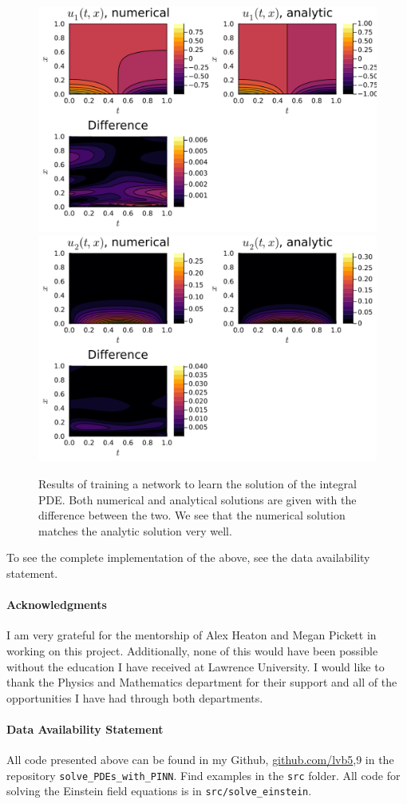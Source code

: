 \documentclass{CUP-JNL-DTM}%
\theoremstyle{definition}
\numberwithin{equation}{section}
\begin{document}
\begin{figure}
\centering
    \includegraphics[width=0.48\linewidth]{figures/integral_PDE_plots/plot_u1.png}
    \includegraphics[width=0.48\linewidth]{figures/integral_PDE_plots/plot_u2.png}
    \caption{Results of training a network to learn the solution of the integral PDE. Both numerical and analytical solutions are given with the difference between the two. We see that the numerical solution matches the analytic solution very well.}
    \label{fig:integro_results}
\end{figure}

To see the complete implementation of the above, see the data availability statement. 


\begin{Backmatter}

\paragraph{Acknowledgments}

I am very grateful for the mentorship of Alex Heaton and Megan Pickett in working on this project. Additionally, none of this would have been possible without the education I have received at Lawrence University. I would like to thank the Physics and Mathematics department for their support and all of the opportunities I have had through both departments. 

\paragraph{Data Availability Statement} All code presented above can be found in my Github, \href{https://github.com/lvb5/solve\_PDEs\_with\_PINN}{github.com/lvb5},9 in the repository \texttt{solve\_PDEs\_with\_PINN}. Find examples in the \texttt{src} folder. All code for solving the Einstein field equations is in \texttt{src/solve\_einstein}.  




\end{Backmatter}
\end{document}

